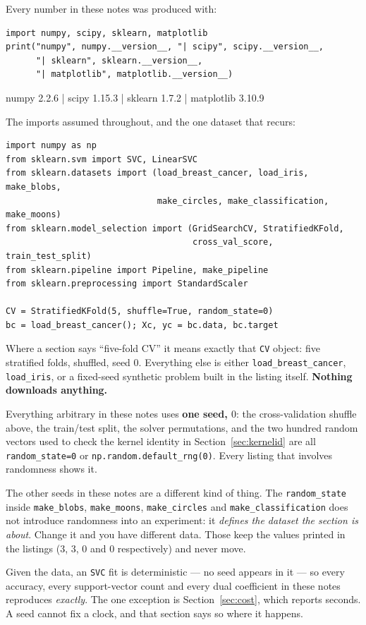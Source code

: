 \documentclass[11pt]{article}
\begin{document}
Every number in these notes was produced with:

\begin{lstlisting}
import numpy, scipy, sklearn, matplotlib
print("numpy", numpy.__version__, "| scipy", scipy.__version__,
      "| sklearn", sklearn.__version__,
      "| matplotlib", matplotlib.__version__)
\end{lstlisting}
\begin{codeout}
numpy 2.2.6 | scipy 1.15.3 | sklearn 1.7.2 | matplotlib 3.10.9
\end{codeout}

The imports assumed throughout, and the one dataset that recurs:

\begin{lstlisting}
import numpy as np
from sklearn.svm import SVC, LinearSVC
from sklearn.datasets import (load_breast_cancer, load_iris, make_blobs,
                              make_circles, make_classification, make_moons)
from sklearn.model_selection import (GridSearchCV, StratifiedKFold,
                                     cross_val_score, train_test_split)
from sklearn.pipeline import Pipeline, make_pipeline
from sklearn.preprocessing import StandardScaler

CV = StratifiedKFold(5, shuffle=True, random_state=0)
bc = load_breast_cancer(); Xc, yc = bc.data, bc.target
\end{lstlisting}

Where a section says ``five-fold CV'' it means exactly that \texttt{CV}
object: five stratified folds, shuffled, seed $0$. Everything else is either
\texttt{load\_breast\_cancer}, \texttt{load\_iris}, or a fixed-seed synthetic
problem built in the listing itself. \textbf{Nothing downloads anything.}

\begin{keyidea}
Everything arbitrary in these notes uses \textbf{one seed, $0$}: the
cross-validation shuffle above, the train/test split, the solver
permutations, and the two hundred random vectors used to check the kernel
identity in Section~\ref{sec:kernelid} are all \texttt{random\_state=0} or
\texttt{np.random.default\_rng(0)}. Every listing that involves randomness
shows it.

The other seeds in these notes are a different kind of thing. The
\texttt{random\_state} inside \texttt{make\_blobs}, \texttt{make\_moons},
\texttt{make\_circles} and \texttt{make\_classification} does not introduce
randomness into an experiment: it \emph{defines the dataset the section is
about}. Change it and you have different data. Those keep the values printed
in the listings ($3$, $3$, $0$ and $0$ respectively) and never move.

Given the data, an \texttt{SVC} fit is deterministic --- no seed appears in
it --- so every accuracy, every support-vector count and every dual
coefficient in these notes reproduces \emph{exactly}. The one exception is
Section~\ref{sec:cost}, which reports seconds. A seed cannot fix a clock, and
that section says so where it happens.
\end{keyidea}
\end{document}
